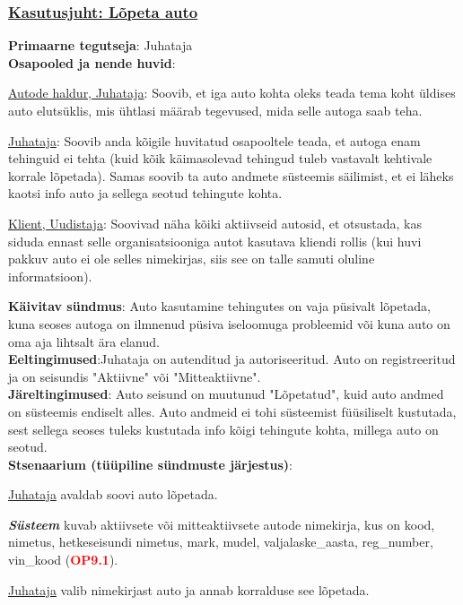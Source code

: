 \begin{shaded}
	\subsubsection{\underline{Kasutusjuht: Lõpeta auto}}
	\textbf{Primaarne tegutseja}: Juhataja \\
	\textbf{Osapooled ja nende huvid}: 
	\useDash
	\begin{myitemize}
		\item \underline{Autode haldur, Juhataja}: Soovib, et iga auto kohta oleks teada tema koht üldises auto elutsüklis, mis ühtlasi määrab tegevused, mida selle autoga saab teha.
		\item \underline{Juhataja}: Soovib anda kõigile huvitatud osapooltele teada, et autoga enam tehinguid ei tehta (kuid kõik käimasolevad tehingud tuleb vastavalt kehtivale korrale lõpetada). Samas soovib ta auto andmete süsteemis säilimist, et ei läheks kaotsi info auto ja sellega seotud tehingute kohta.
		\item \underline{Klient, Uudistaja}: Soovivad näha kõiki aktiivseid autosid, et otsustada, kas siduda ennast selle organisatsiooniga autot kasutava kliendi rollis (kui huvi pakkuv auto ei ole selles nimekirjas, siis see on talle samuti oluline informatsioon).
	\end{myitemize}
	\textbf{Käivitav sündmus}: Auto kasutamine tehingutes on vaja püsivalt lõpetada, kuna seoses autoga on ilmnenud püsiva iseloomuga probleemid või kuna auto on oma aja lihtsalt ära elanud. \\
	\textbf{Eeltingimused}:Juhataja on autenditud ja autoriseeritud. Auto on registreeritud ja on seisundis "Aktiivne" või "Mitteaktiivne".\\
	\textbf{Järeltingimused}: Auto seisund on muutunud "Lõpetatud", kuid auto andmed on süsteemis endiselt alles. Auto andmeid ei tohi süsteemist füüsiliselt kustutada, sest sellega seoses tuleks kustutada info kõigi tehingute kohta, millega auto on seotud. \\
	\textbf{Stsenaarium (tüüpiline sündmuste järjestus)}:
	\begin{myenumerate}
		\item \underline{Juhataja} avaldab soovi auto lõpetada.
		\item\textit \textbf{Süsteem} kuvab aktiivsete või mitteaktiivsete autode nimekirja, kus on kood, nimetus,  hetkeseisundi nimetus, mark, mudel, valjalaske\_aasta, reg\_number, vin\_kood (\textbf{\textcolor{red}{OP9.1}}).
		\item \underline{Juhataja} valib nimekirjast auto ja annab korralduse see lõpetada.

\end{myenumerate}
\end{shaded}
